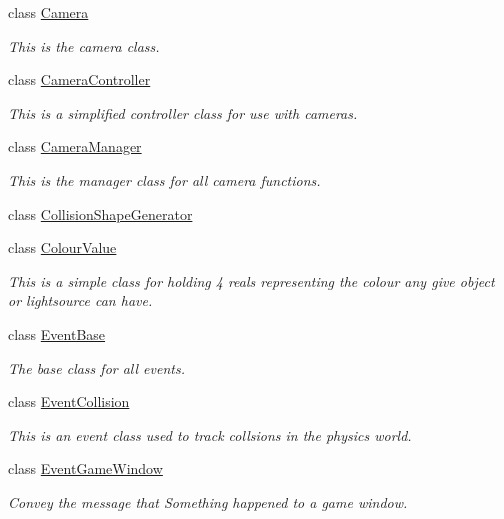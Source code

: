 \begin{DoxyCompactItemize}
class \hyperlink{classphys_1_1Camera}{Camera}
\begin{DoxyCompactList}\small\item\em This is the camera class. \item\end{DoxyCompactList}\item 
class \hyperlink{classphys_1_1CameraController}{CameraController}
\begin{DoxyCompactList}\small\item\em This is a simplified controller class for use with cameras. \item\end{DoxyCompactList}\item 
class \hyperlink{classphys_1_1CameraManager}{CameraManager}
\begin{DoxyCompactList}\small\item\em This is the manager class for all camera functions. \item\end{DoxyCompactList}\item 
class \hyperlink{classphys_1_1CollisionShapeGenerator}{CollisionShapeGenerator}
\item 
class \hyperlink{classphys_1_1ColourValue}{ColourValue}
\begin{DoxyCompactList}\small\item\em This is a simple class for holding 4 reals representing the colour any give object or lightsource can have. \item\end{DoxyCompactList}\item 
class \hyperlink{classphys_1_1EventBase}{EventBase}
\begin{DoxyCompactList}\small\item\em The base class for all events. \item\end{DoxyCompactList}\item 
class \hyperlink{classphys_1_1EventCollision}{EventCollision}
\begin{DoxyCompactList}\small\item\em This is an event class used to track collsions in the physics world. \item\end{DoxyCompactList}\item 
class \hyperlink{classphys_1_1EventGameWindow}{EventGameWindow}
\begin{DoxyCompactList}\small\item\em Convey the message that Something happened to a game window. \item\end{DoxyCompactList}\item 

\end{DoxyCompactItemize}
